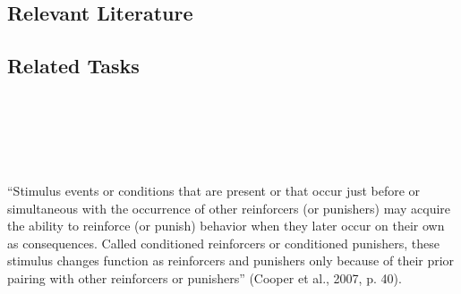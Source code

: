\subsection{Relevant Literature}
\begin{refsection}
\nocite{test,alang2017police,clayton2018black}
\printbibliography[heading=none]
\end{refsection}
%
\subsection{Related Tasks}
\fourdOne{}\\
\fourdTwo{}\\
\fouriSeven{}\\
%
%
%
%
%
%
%
%
%
%
%
\section[\foureEleven{}]{\foureEleven{}%
              }
``Stimulus events or conditions that are present or that occur just before or simultaneous with the occurrence of other reinforcers (or punishers) may acquire the ability to reinforce (or punish) behavior when they later occur on their own as consequences. Called conditioned reinforcers or conditioned punishers, these stimulus changes function as reinforcers and punishers only because of their prior pairing with other reinforcers or punishers'' (Cooper et al., 2007, p. 40).

